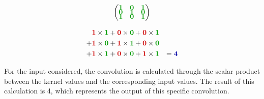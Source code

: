 \hspace{0.05\textwidth}
\begin{minipage}{0.4\textwidth}
$$
\begin{pmatrix}
\mathbf{\textcolor{mygreen}{1}} & \mathbf{\textcolor{mygreen}{0}} & \mathbf{\textcolor{mygreen}{1}} \\[-0.2cm]
\mathbf{\textcolor{mygreen}{0}} & \mathbf{\textcolor{mygreen}{1}} & \mathbf{\textcolor{mygreen}{0}} \\[-0.2cm]
\mathbf{\textcolor{mygreen}{1}} & \mathbf{\textcolor{mygreen}{0}} & \mathbf{\textcolor{mygreen}{1}} \\
\end{pmatrix}
$$
\end{minipage}
\begin{minipage}{0.4\textwidth}
$$
\begin{aligned}
&\mathbf{\textcolor{myred}{1}} \times \mathbf{\textcolor{mygreen}{1}} + \mathbf{\textcolor{myred}{0}} \times \mathbf{\textcolor{mygreen}{0}} + \mathbf{\textcolor{myred}{0}} \times \mathbf{\textcolor{mygreen}{1}}&\\
+ &\mathbf{\textcolor{myred}{1}} \times \mathbf{\textcolor{mygreen}{0}} + \mathbf{\textcolor{myred}{1}} \times \mathbf{\textcolor{mygreen}{1}} + \mathbf{\textcolor{myred}{0}} \times \mathbf{\textcolor{mygreen}{0}}&\\
+ &\mathbf{\textcolor{myred}{1}} \times \mathbf{\textcolor{mygreen}{1}} + \mathbf{\textcolor{myred}{0}} \times \mathbf{\textcolor{mygreen}{0}} + \mathbf{\textcolor{myred}{1}} \times \mathbf{\textcolor{mygreen}{1}}&=\mathbf{\textcolor{mybluee}{4}}\\
\end{aligned}
$$
\end{minipage}
\hspace{0.05\textwidth}

For the input considered, the convolution is calculated through the scalar product between the kernel values and the corresponding input values. 
The result of this calculation is 4, which represents the output of this specific convolution.

